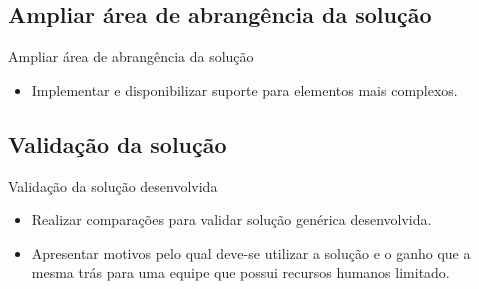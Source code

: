 \documentclass{beamer}
\begin{document}
\subsection{Ampliar área de abrangência da solução}
\begin{frame}{Ampliar área de abrangência da solução}
	\begin{itemize}
		\item Implementar e disponibilizar suporte para elementos mais complexos.
	\end{itemize}
\end{frame}

\subsection{Validação da solução}
\begin{frame}{Validação da solução desenvolvida}
	\begin{itemize}
		\item Realizar comparações para validar solução genérica desenvolvida.
		\item Apresentar motivos pelo qual deve-se utilizar a solução e o ganho que a mesma trás para uma equipe que possui
	recursos humanos limitado.
	\end{itemize}
\end{frame}


\begin{frame}
\titlepage
\end{frame}
\end{document}
